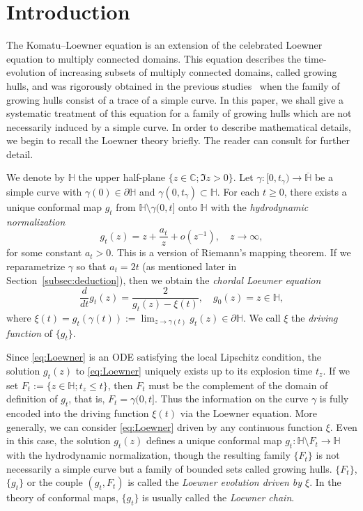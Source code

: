 \documentclass[preprint,12pt]{elsarticle}
\theoremstyle{definition}
\newcommand{\C}{\mathbb{C}}
\newcommand{\uhp}{\mathbb{H}}
\begin{document}

\section{Introduction}
\label{sec:intro}

The Komatu--Loewner equation is an extension of the celebrated
Loewner equation to multiply connected domains.
This equation describes the time-evolution of increasing subsets
of multiply connected domains, called growing hulls,
and was rigorously obtained in the previous studies~\cite{BF08, CFR16, CF18}
when the family of growing hulls consist of a trace of a simple curve.
In this paper, we shall give a systematic treatment of this equation
for a family of growing hulls which are not necessarily induced by a simple curve.
In order to describe mathematical details,
we begin to recall the Loewner theory briefly.
The reader can consult \cite{La05} for further detail.

We denote by $\uhp$ the upper half-plane $\{z \in \C; \Im z>0\}$.
Let $\gamma \colon [0, t_{\gamma}) \to \overline{\uhp}$ be a simple curve
with $\gamma(0) \in \partial \uhp$ and $\gamma(0, t_{\gamma}) \subset \uhp$.
For each $t \geq 0$, there exists a unique conformal map $g_t$
from $\uhp \setminus \gamma(0,t]$ onto $\uhp$
with the \emph{hydrodynamic normalization}
\[
g_t(z)=z+\frac{a_t}{z}+o(z^{-1}), \quad z \to \infty,
\]
for some constant $a_t>0$.
This is a version of Riemann's mapping theorem.
If we reparametrize $\gamma$ so that $a_t=2t$
(as mentioned later in Section~\ref{subsec:deduction}),
then we obtain the \emph{chordal Loewner equation}
\begin{equation} \label{eq:Loewner}
\frac{d}{dt}g_t(z)=\frac{2}{g_t(z)-\xi(t)}, \quad g_0(z)=z \in \uhp,
\end{equation}
where $\xi(t)=g_t(\gamma(t)):=\lim_{z \to \gamma(t)}g_t(z) \in \partial \uhp$.
We call $\xi$ the \emph{driving function} of $\{g_t\}$.

Since \eqref{eq:Loewner} is an ODE satisfying the local Lipschitz condition,
the solution $g_t(z)$ to \eqref{eq:Loewner} uniquely exists
up to its explosion time $t_z$.
If we set $F_t:=\{z \in \uhp; t_z \leq t\}$,
then $F_t$ must be the complement of the domain of definition of $g_t$,
that is, $F_t=\gamma(0, t]$.
Thus the information on the curve $\gamma$ is fully encoded into
the driving function $\xi(t)$ via the Loewner equation.
More generally, we can consider \eqref{eq:Loewner} driven by
any continuous function $\xi$.
Even in this case, the solution $g_t(z)$ defines a unique conformal map
$g_t \colon \uhp \setminus F_t \to \uhp$ with the hydrodynamic normalization,
though the resulting family $\{F_t\}$ is not necessarily a simple curve
but a family of bounded sets called growing hulls.
$\{F_t\}$, $\{g_t\}$ or the couple $(g_t, F_t)$ is called
the \emph{Loewner evolution driven by $\xi$}.
In the theory of conformal maps,
$\{g_t\}$ is usually called the \emph{Loewner chain}.
\end{document}
